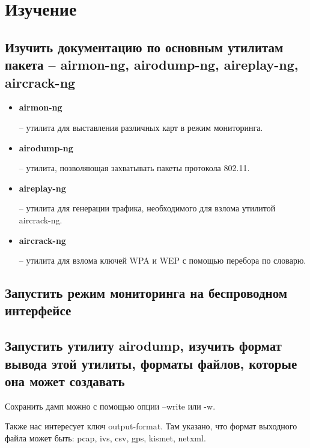 \documentclass[a4paper]{article}
\begin{document}
\section{Изучение}

\subsection{Изучить документацию по основным утилитам пакета – airmon-ng, airodump-ng, aireplay-ng, aircrack-ng}

\begin{itemize}

\item \textbf{airmon-ng}

-- 	утилита для выставления различных карт в режим мониторинга.

\item \textbf{airodump-ng}

-- утилита, позволяющая захватывать пакеты протокола 802.11.

\item \textbf{aireplay-ng}

-- утилита для генерации трафика, необходимого для взлома утилитой aircrack-ng.

\item \textbf{aircrack-ng}

-- утилита для взлома ключей WPA и WEP с помощью перебора по словарю.

\end{itemize}

\subsection{Запустить режим мониторинга на беспроводном интерфейсе}



\subsection{Запустить утилиту airodump, изучить формат вывода этой утилиты, форматы файлов, которые она может создавать}



Сохранить дамп можно с помощью опции --write или -w.

Также нас интересует ключ output-format. Там указано, что формат выходного файла может быть: pcap, ivs, csv, gps, kismet, netxml.
\end{document}
